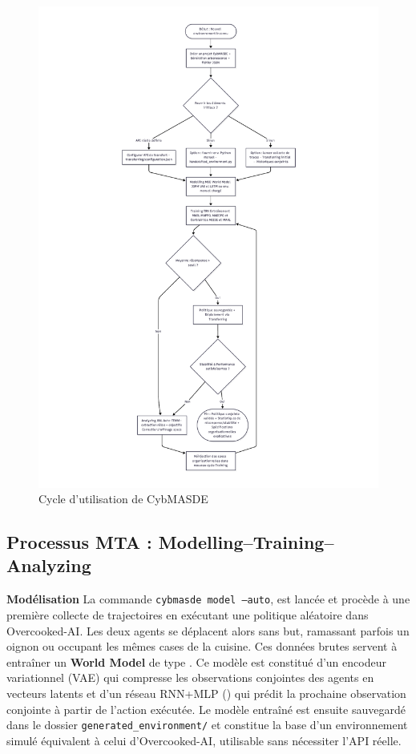 \begin{figure}[H]
  \centering
  \includegraphics[trim={5cm 1cm 5cm 1cm},clip,height=\textheight]{figures/CybMASDE_user_flowchart.pdf}
  \caption{Cycle d'utilisation de CybMASDE}
  \label{fig:cybmasde_cycle}
\end{figure}

\subsection{Processus MTA : Modelling–Training–Analyzing}

\noindent
\textbf{Modélisation} \quad
La commande \texttt{cybmasde model --auto},  est lancée et procède à une première collecte de trajectoires en exécutant une politique aléatoire dans Overcooked-AI. Les deux agents se déplacent alors sans but, ramassant parfois un oignon ou occupant les mêmes cases de la cuisine. Ces données brutes servent à entraîner un \textbf{World Model} de type . Ce modèle est constitué d'un encodeur variationnel (VAE) qui compresse les observations conjointes des agents en vecteurs latents et d'un réseau RNN+MLP () qui prédit la prochaine observation conjointe à partir de l'action exécutée. Le modèle entraîné est ensuite sauvegardé dans le dossier \texttt{generated\_environment/} et constitue la base d'un environnement simulé équivalent à celui d'Overcooked-AI, utilisable sans nécessiter l'API réelle.

